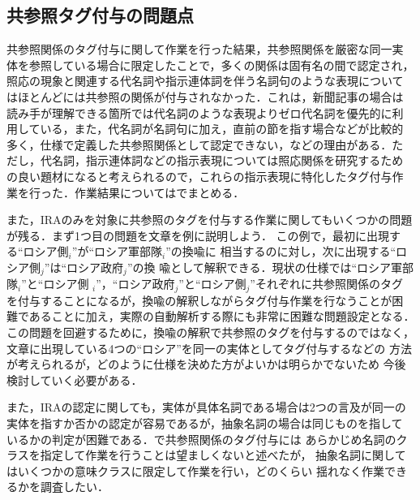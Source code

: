 \documentclass[japanese]{jnlp_1.4}
\def\ssec#1{}
\begin{document}
\subsection{共参照タグ付与の問題点}
\label{ssec:problem_coref}


共参照関係のタグ付与に関して作業を行った結果，共参照関係を厳密な同一実
体を参照している場合に限定したことで，多くの関係は固有名の間で認定され，
照応の現象と関連する代名詞や指示連体詞を伴う名詞句のような表現について
はほとんどには共参照の関係が付与されなかった．これは，新聞記事の場合は
読み手が理解できる箇所では代名詞のような表現よりゼロ代名詞を優先的に利
用している，また，代名詞が名詞句に加え，直前の節を指す場合などが比較的
多く，仕様で定義した共参照関係として認定できない，などの理由がある．た
だし，代名詞，指示連体詞などの指示表現については照応関係を研究するため
の良い題材になると考えられるので，これらの指示表現に特化したタグ付与作
業を行った．作業結果については\ssec{revise_coref}でまとめる．


また，IRAのみを対象に共参照のタグを付与する作業に関してもいくつかの問題
が残る．まず1つ目の問題を文章を例に説明しよう．
この例で，最初に出現する``ロシア側$_i$''が``ロシア軍部隊$_i$''の換喩に
相当するのに対し，次に出現する``ロシア側$_j$''は``ロシア政府$_j$''の換
喩として解釈できる．現状の仕様では``ロシア軍部隊$_i$''と``ロシア側
$_i$''，``ロシア政府$_j$''と``ロシア側$_j$''それぞれに共参照関係のタグ
を付与することになるが，換喩の解釈しながらタグ付与作業を行なうことが困
難であることに加え，実際の自動解析する際にも非常に困難な問題設定となる．
この問題を回避するために，換喩の解釈で共参照のタグを付与するのではなく，
文章に出現している4つの``ロシア''を同一の実体としてタグ付与するなどの
方法が考えられるが，どのように仕様を決めた方がよいかは明らかでないため
今後検討していく必要がある．


また，IRAの認定に関しても，実体が具体名詞である場合は2つの言及が同一の
実体を指すか否かの認定が容易であるが，抽象名詞の場合は同じものを指して
いるかの判定が困難である．\ssec{spec_coref}で共参照関係のタグ付与には
あらかじめ名詞のクラスを指定して作業を行うことは望ましくないと述べたが，
抽象名詞に関してはいくつかの意味クラスに限定して作業を行い，どのくらい
揺れなく作業できるかを調査したい．
\end{document}
